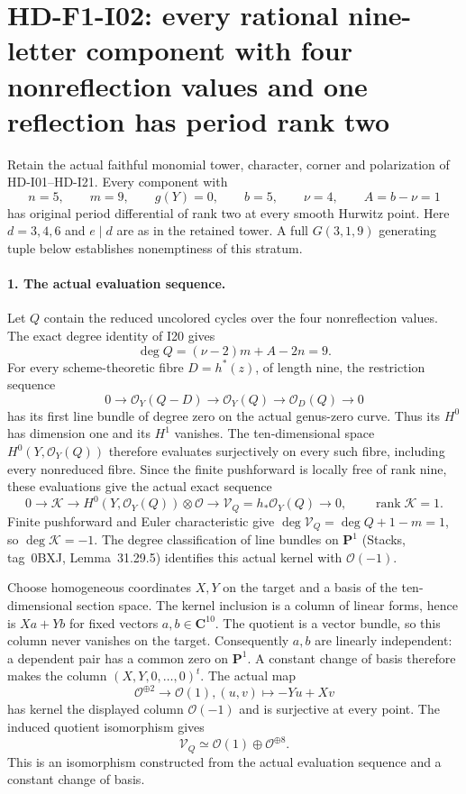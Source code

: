 \section[HD-F1-I02: nine letters and one reflection]{HD-F1-I02: every rational nine-letter component with four nonreflection values and one reflection has period rank two}
\label{sec:f1-nine-letter-one-reflection-rank}

Retain the actual faithful monomial tower, character, corner
and polarization of HD-I01--HD-I21. Every component with
\[
 n=5,\qquad m=9,\qquad g(Y)=0,\qquad
 b=5,\qquad \nu=4,\qquad A=b-\nu=1
\]
has original period differential of rank two at every smooth
Hurwitz point. Here $d=3,4,6$ and $e\mid d$ are as in the
retained tower. A full $G(3,1,9)$ generating tuple below
establishes nonemptiness of this stratum.

\paragraph{1. The actual evaluation sequence.}
Let $Q$ contain the reduced uncolored cycles over the four
nonreflection values. The exact degree identity of I20 gives
\[
 \deg Q=(\nu-2)m+A-2n=9.
\]
For every scheme-theoretic fibre $D=h^*(z)$, of length nine,
the restriction sequence
\[
 0\longrightarrow\mathcal O_Y(Q-D)
 \longrightarrow\mathcal O_Y(Q)
 \longrightarrow\mathcal O_D(Q)\longrightarrow0
\]
has its first line bundle of degree zero on the actual
genus-zero curve. Thus its $H^0$ has dimension one and its
$H^1$ vanishes. The ten-dimensional space
$H^0(Y,\mathcal O_Y(Q))$ therefore evaluates surjectively
on every such fibre, including every nonreduced fibre.
Since the finite pushforward is locally free of rank nine,
these evaluations give the actual exact sequence
\[
 0\longrightarrow\mathcal K
 \longrightarrow H^0(Y,\mathcal O_Y(Q))\otimes\mathcal O
 \longrightarrow\mathcal V_Q=h_*\mathcal O_Y(Q)
 \longrightarrow0,
 \qquad \operatorname{rank}\mathcal K=1.
\]
Finite pushforward and Euler characteristic give
$\deg\mathcal V_Q=\deg Q+1-m=1$, so
$\deg\mathcal K=-1$. The degree classification of line
bundles on $\mathbf P^1$ (Stacks, tag~0BXJ,
Lemma~31.29.5) identifies this actual kernel with
$\mathcal O(-1)$.

Choose homogeneous coordinates $X,Y$ on the target and a
basis of the ten-dimensional section space. The kernel
inclusion is a column of linear forms, hence is
$X a+Y b$ for fixed vectors $a,b\in\mathbf C^{10}$.
The quotient is a vector bundle, so this column never
vanishes on the target. Consequently $a,b$ are linearly
independent: a dependent pair has a common zero on
$\mathbf P^1$. A constant change of basis therefore makes
the column $(X,Y,0,\ldots,0)^t$.
The actual map
\[
 \mathcal O^{\oplus2}\longrightarrow\mathcal O(1),
                 (u,v)\longmapsto -Yu+Xv
\]
has kernel the displayed column $\mathcal O(-1)$ and is
surjective at every point. The induced quotient isomorphism
gives
\[
             \mathcal V_Q\simeq
                   \mathcal O(1)\oplus\mathcal O^{\oplus8}.
\]
This is an isomorphism constructed from the actual evaluation
sequence and a constant change of basis.

